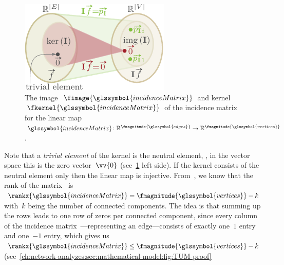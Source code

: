 % 
\begin{figure}%
    \vspace{-4mm}
    \includegraphics[scale=1,page=1]{networkAnalyzes/figures/ImageAndKernelOfALinearMappingIncidenceMatrix.pdf}
    \vspace{-5mm}%
    \caption[The image and kernel of the incidence
    matrix~.]{%
    The image~$\fimage{\glssymbol{incidenceMatrix}}$ and kernel~$\fkernel{
    \glssymbol{incidenceMatrix}}$ of the incidence
    matrix~ for the linear map~$
        \glssymbol{incidenceMatrix}
        \colon
        \reals^{
            \fmagnitude{\glssymbol{edges}}
        }
        \to
        \reals^{
            \fmagnitude{\glssymbol{vertices}}
        }
    $.
    }%
    \label{ch:network-analysis:fig:kernel-and-image-incidenceMatrix}%
    \vspace{-2mm}%
\end{figure}%
% 
\noindent Note that a \emph{trivial element} of the kernel is the neutral
element, \ie, in the vector space this is the zero vector~$\vv{0}$
(see~\cref{ch:network-analysis:fig:kernel-and-image-incidenceMatrix} left side).
If the kernel consists of the neutral element only then the linear map is
injective.
% 
% 
From~\textcite[p.66; Theorem 4--3]{Ses61}, we know that the rank of the
matrix~ is~$
% 
\rankx{ \glssymbol{incidenceMatrix} }
=
\fmagnitude{ \glssymbol{vertices} } 
- 
k
% 
$ with~$k$ being the number of connected components.
% 
The idea is that summing up the rows leads to one row of zeros per connected
component, since every column of the incidence
matrix~---representing an edge---consists of exactly
one~$1$ entry and one~$-1$ entry, which gives us~$
    \rankx{\glssymbol{incidenceMatrix}} 
    \leq 
    \fmagnitude{ \glssymbol{vertices} }
    - k
$
(see~\cref{ch:network-analyzes:sec:mathematical-model:fig:TUM-proof}
